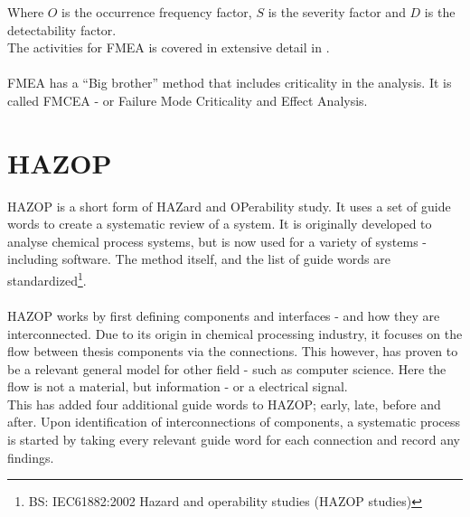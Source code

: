 \documentclass[10pt,oneside]{book}                  %
\begin{document}
Where $O$ is the occurrence frequency factor, $S$ is the severity factor and $D$ is the detectability factor.\\
The activities for FMEA is covered in extensive detail in \cite{MILSTD1629A}.\\
\\
FMEA has a ``Big brother'' method that includes criticality in the analysis. It is called FMCEA - or Failure Mode Criticality and Effect Analysis.


\section{HAZOP}
HAZOP is a short form of HAZard and OPerability study. It uses a set of guide words to create a systematic review of a system. It is originally developed to analyse chemical process systems, but is now used for a variety of systems - including software. The method itself, and the list of guide words are standardized\footnote{BS: IEC61882:2002 Hazard and operability studies (HAZOP studies)}.\\
\\
HAZOP works by first defining components and interfaces - and how they are interconnected. Due to its origin in chemical processing industry, it focuses on the flow between thesis components via the connections. This however, has proven to be a relevant general model for other field - such as computer science. Here the flow is not a material, but information - or a electrical signal.\\
This has added four additional guide words to HAZOP; early, late, before and after.
Upon identification of interconnections of components, a systematic process is started by taking every relevant guide word for each connection and record any findings.
\end{document}
